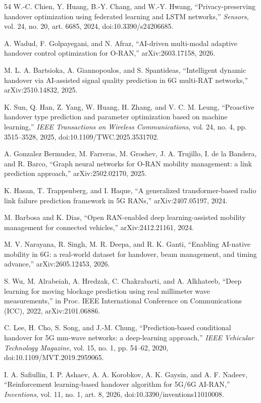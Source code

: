 \begin{thebibliography}{54}
 W.-C. Chien, Y. Huang, B.-Y. Chang, and W.-Y. Hwang, ``Privacy-preserving handover optimization using federated learning and LSTM networks,'' \textit{Sensors}, vol. 24, no. 20, art. 6685, 2024, doi:10.3390/s24206685.

 A. Wadud, F. Golpayegani, and N. Afraz, ``AI-driven multi-modal adaptive handover control optimization for O-RAN,'' arXiv:2603.17158, 2026.

 M. L. A. Bartsioka, A. Giannopoulos, and S. Spantideas, ``Intelligent dynamic handover via AI-assisted signal quality prediction in 6G multi-RAT networks,'' arXiv:2510.14832, 2025.

 K. Sun, Q. Han, Z. Yang, W. Huang, H. Zhang, and V. C. M. Leung, ``Proactive handover type prediction and parameter optimization based on machine learning,'' \textit{IEEE Transactions on Wireless Communications}, vol. 24, no. 4, pp. 3515--3528, 2025, doi:10.1109/TWC.2025.3531702.

 A. Gonzalez Bermudez, M. Farreras, M. Groshev, J. A. Trujillo, I. de la Bandera, and R. Barco, ``Graph neural networks for O-RAN mobility management: a link prediction approach,'' arXiv:2502.02170, 2025.

 K. Hasan, T. Trappenberg, and I. Haque, ``A generalized transformer-based radio link failure prediction framework in 5G RANs,'' arXiv:2407.05197, 2024.

 M. Barbosa and K. Dias, ``Open RAN-enabled deep learning-assisted mobility management for connected vehicles,'' arXiv:2412.21161, 2024.

 M. V. Narayana, R. Singh, M. R. Deepa, and R. K. Ganti, ``Enabling AI-native mobility in 6G: a real-world dataset for handover, beam management, and timing advance,'' arXiv:2605.12453, 2026.

 S. Wu, M. Alrabeiah, A. Hredzak, C. Chakrabarti, and A. Alkhateeb, ``Deep learning for moving blockage prediction using real millimeter wave measurements,'' in Proc. IEEE International Conference on Communications (ICC), 2022, arXiv:2101.06886.

 C. Lee, H. Cho, S. Song, and J.-M. Chung, ``Prediction-based conditional handover for 5G mm-wave networks: a deep-learning approach,'' \textit{IEEE Vehicular Technology Magazine}, vol. 15, no. 1, pp. 54--62, 2020, doi:10.1109/MVT.2019.2959065.

 I. A. Safiullin, I. P. Ashaev, A. A. Korobkov, A. K. Gaysin, and A. F. Nadeev, ``Reinforcement learning-based handover algorithm for 5G/6G AI-RAN,'' \textit{Inventions}, vol. 11, no. 1, art. 8, 2026, doi:10.3390/inventions11010008.


\end{thebibliography}
